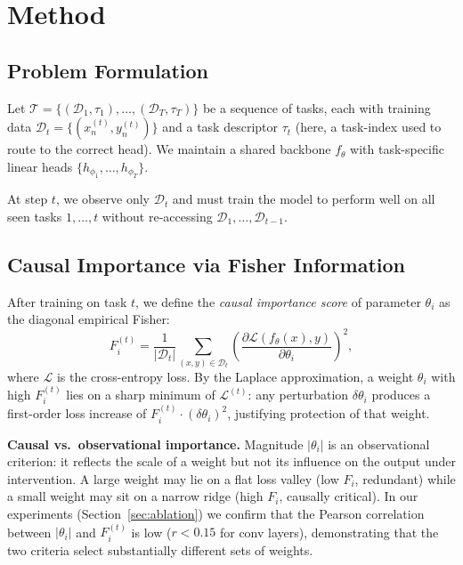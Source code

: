 \documentclass[conference]{IEEEtran}
\begin{document}
\section{Method}

\subsection{Problem Formulation}

Let $\mathcal{T} = \{(\mathcal{D}_1, \tau_1), \ldots, (\mathcal{D}_T, \tau_T)\}$ be
a sequence of tasks, each with training data $\mathcal{D}_t = \{(x^{(t)}_n, y^{(t)}_n)\}$
and a task descriptor $\tau_t$ (here, a task-index used to route to the correct head).
We maintain a shared backbone $f_\theta$ with task-specific linear heads
$\{h_{\phi_1}, \ldots, h_{\phi_T}\}$.

At step $t$, we observe only $\mathcal{D}_t$ and must train the model to perform well
on all seen tasks $1, \ldots, t$ without re-accessing $\mathcal{D}_1, \ldots, \mathcal{D}_{t-1}$.

\subsection{Causal Importance via Fisher Information}

After training on task $t$, we define the \emph{causal importance score} of parameter
$\theta_i$ as the diagonal empirical Fisher:
\begin{equation}
    F_i^{(t)} = \frac{1}{|\mathcal{D}_t|}\sum_{(x,y)\in\mathcal{D}_t}
    \left(\frac{\partial \mathcal{L}(f_\theta(x), y)}{\partial \theta_i}\right)^2,
    \label{eq:fisher}
\end{equation}
where $\mathcal{L}$ is the cross-entropy loss.  By the Laplace approximation, a weight
$\theta_i$ with high $F_i^{(t)}$ lies on a sharp minimum of $\mathcal{L}^{(t)}$:
any perturbation $\delta\theta_i$ produces a first-order loss increase of
$F_i^{(t)} \cdot (\delta\theta_i)^2$, justifying protection of that weight.

\textbf{Causal vs.\ observational importance.}
Magnitude $|\theta_i|$ is an observational criterion: it reflects the scale of a weight
but not its influence on the output under intervention.
A large weight may lie on a flat loss valley (low $F_i$, redundant) while a small weight
may sit on a narrow ridge (high $F_i$, causally critical).
In our experiments (Section~\ref{sec:ablation}) we confirm that the Pearson correlation
between $|\theta_i|$ and $F_i^{(t)}$ is low ($r < 0.15$ for conv layers), demonstrating
that the two criteria select substantially different sets of weights.
\end{document}
